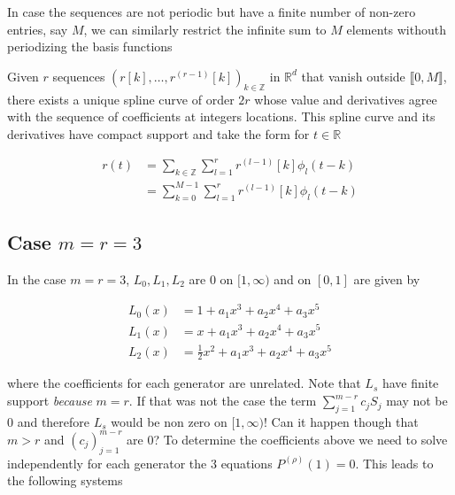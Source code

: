 \documentclass[a4paper, 11pt]{article}
\begin{document}
In case the sequences are not periodic but have a finite number of non-zero entries, say $M$, we can similarly restrict 
the infinite sum to $M$ elements withouth periodizing the basis functions

\begin{cor}{2}
  Given $r$ sequences  ${(r[k], \dots, r^{(r-1)}[k])}_{k \in \mathbb{Z}}$ in $\mathbb{R}^d$ that vanish outside 
  $\llbracket 0, M \rrbracket$, there exists a unique spline curve of order $2r$ whose value and derivatives agree with 
  the sequence of coefficients at integers locations.  This spline curve and its derivatives have compact support and 
  take the form for $t \in \mathbb{R}$
  
  \begin{align}
    r(t) &= \sum_{k \in \mathbb{Z}} \sum_{l=1}^r r^{(l-1)}[k] \phi_l(t-k) \\
    &= \sum_{k=0}^{M-1} \sum_{l=1}^r  r^{(l-1)}[k] \phi_{l}(t-k)
  \end{align}
\end{cor}


\subsection{Case $m=r=3$}

In the case $m=r=3$, $L_0, L_1, L_2$ are 0 on $[1, \infty)$ and on $[0,1]$ are given by 

\begin{align}
  L_0(x) &= 1 + a_1 x^3 + a_2 x^4 + a_3 x^5 \\
  L_1(x) &= x + a_1 x^3 + a_2 x^4 + a_3 x^5 \\
  L_2(x) &= \frac{1}{2}x^2 + a_1 x^3 + a_2 x^4 + a_3 x^5
\end{align}

where the coefficients for each generator are unrelated. Note that $L_s$ have finite support \emph{because} $m=r$. If 
that was not the case the term $\displaystyle \sum_{j=1}^{m-r} c_j S_j$ may not be 0 and therefore $L_s$ would be non 
zero on $[1, \infty)$! Can it happen though that $m > r$ and ${(c_j)}_{j=1}^{m-r}$ are 0? To determine the coefficients 
above we need to solve independently for each generator the 3 equations $P^{(\rho)}(1) = 0$. This leads to the following 
systems
\end{document}
